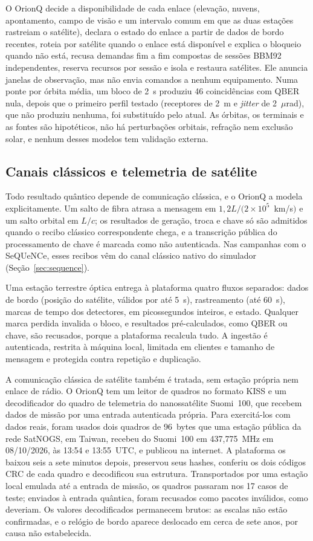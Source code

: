 \documentclass[12pt]{article}
\begin{document}
O OrionQ decide a disponibilidade de cada enlace (elevação, nuvens, apontamento,
campo de visão e um intervalo comum em que as duas estações rastreiam o
satélite), declara o estado do enlace a partir de dados de bordo recentes,
roteia por satélite quando o enlace está disponível e explica o bloqueio quando
não está, recusa demandas fim a fim compostas de sessões BBM92 independentes,
reserva recursos por sessão e isola e restaura satélites. Ele anuncia janelas de
observação, mas não envia comandos a nenhum equipamento. Numa ponte por órbita
média, um bloco de 2~s produziu 46 coincidências com QBER nula, depois que o
primeiro perfil testado (receptores de 2~m e \textit{jitter} de 2~$\mu$rad), que
não produziu nenhuma, foi substituído pelo atual. As
órbitas, os terminais e as fontes são hipotéticos, não há perturbações orbitais,
refração nem exclusão solar, e nenhum desses modelos tem validação externa.

\subsection{Canais clássicos e telemetria de satélite}
\label{sec:tec_classica}

Todo resultado quântico depende de comunicação clássica, e o OrionQ a modela
explicitamente. Um salto de fibra atrasa a mensagem em $1{,}2L/(2\times10^5$~km/s$)$
e um salto orbital em $L/c$; os resultados de geração, troca e chave só são
admitidos quando o recibo clássico correspondente chega, e a transcrição pública
do processamento de chave é marcada como não autenticada. Nas campanhas com o
SeQUeNCe, esses recibos vêm do canal clássico nativo do simulador
(Seção~\ref{sec:sequence}).

Uma estação terrestre óptica entrega à plataforma quatro fluxos separados: dados
de bordo (posição do satélite, válidos por até 5~s), rastreamento (até 60~s),
marcas de tempo dos detectores, em picossegundos inteiros, e estado. Qualquer
marca perdida invalida o bloco, e resultados pré-calculados, como QBER ou chave,
são recusados, porque a plataforma recalcula tudo. A ingestão é autenticada,
restrita à máquina local, limitada em clientes e tamanho de mensagem e protegida
contra repetição e duplicação.

A comunicação clássica de satélite também é tratada, sem estação própria nem
enlace de rádio. O OrionQ tem um leitor de quadros no formato KISS e um
decodificador do quadro de telemetria do nanossatélite Suomi~100, que recebem
dados de missão por uma entrada autenticada própria. Para exercitá-los com dados
reais, foram usados dois quadros de 96~bytes que uma estação pública da rede
SatNOGS, em Taiwan, recebeu do Suomi~100 em 437,775~MHz em 08/10/2026, às 13:54 e
13:55~UTC, e publicou na internet. A plataforma os baixou seis a sete minutos
depois, preservou seus hashes, conferiu os dois códigos CRC de cada quadro e
decodificou sua estrutura. Transportados por uma estação local emulada até a
entrada de missão, os quadros passaram nos 17 casos de teste; enviados à entrada
quântica, foram recusados como pacotes inválidos, como deveriam. Os valores
decodificados permanecem brutos: as escalas não estão confirmadas, e o relógio
de bordo aparece deslocado em cerca de sete anos, por causa não estabelecida.
\end{document}
